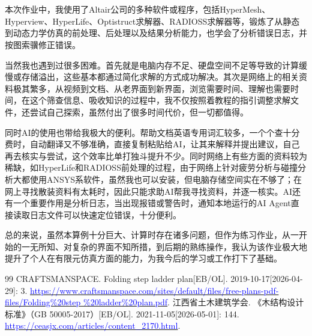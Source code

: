 \documentclass[12pt, oneside, a4paper]{ctexart}
\begin{document}
\section{}
\par{}
本次作业中，我使用了Altair公司的多种软件或程序，包括HyperMesh、Hyperview、HyperLife、Optistruct求解器、RADIOSS求解器等，锻炼了从静态到动态力学仿真的前处理、后处理以及结果分析能力，也学会了分析错误日志，并按图索骥修正错误。
\par{}
当然我也遇到过很多困难。首先就是电脑内存不足、硬盘空间不足等导致的计算缓慢或存储溢出，这些基本都通过简化求解的方式成功解决。其次是网络上的相关资料极其繁多，从视频到文档、从老界面到新界面，浏览需要时间、理解也需要时间，在这个筛查信息、吸收知识的过程中，我不仅按照着教程的指引调整求解文件，还尝试自己探索，虽然付出了很多时间代价，但一切都值得。
\par{}
同时AI的使用也带给我极大的便利。帮助文档英语专用词汇较多，一个个查十分费时，自动翻译又不够准确，直接复制粘贴给AI，让其来解释并提出建议，自己再去核实与尝试，这个效率比单打独斗提升不少。同时网络上有些方面的资料较为稀缺，如HyperLife和RADIOSS前处理的过程，由于网络上针对疲劳分析与碰撞分析大都使用ANSYS系软件，虽然我也可以安装，但电脑存储空间实在不够了；在网上寻找散装资料有太耗时，因此只能求助AI帮我寻找资料，并逐一核实。AI还有一个重要作用是分析日志，当出现报错或警告时，通知本地运行的AI Agent直接读取日志文件可以快速定位错误，十分便利。
\par{}
总的来说，虽然本算例十分巨大、计算时存在诸多问题，但作为练习作业，从一开始的一无所知、对复杂的界面不知所措，到后期的熟练操作，我认为该作业极大地提升了个人在有限元仿真方面的能力，为我今后的学习或工作打下了基础。
\begin{flushleft}
    \begin{small}
        \begin{thebibliography}{99}
            CRAFTSMANSPACE. Folding step ladder plan[EB/OL]. 2019-10-17[2026-04-29]: 3. \href{https://www.craftsmanspace.com/sites/default/files/free-plans-pdf-files/Folding%20step%20ladder%20plan.pdf}{\textcolor{blue}{https://www.craftsmanspace.com/sites/default/files/free-plans-pdf-files/Folding\%20step \%20ladder\%20plan.pdf}}.
            \vspace{-3mm}
            江西省土木建筑学会. 《木结构设计标准》（GB 50005-2017）[EB/OL]. 2021-11-05[2026-05-01]: 144. \href{https://ceasjx.com/articles/content_2170.html}{\textcolor{blue}{https://ceasjx.com/articles/content\_2170.html}}.
        \end{thebibliography}
    \end{small}
\end{flushleft}
\end{document}
